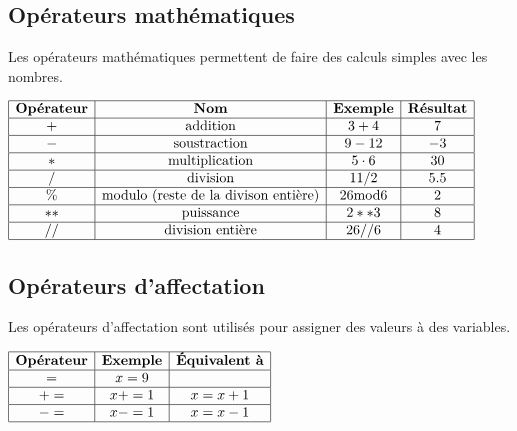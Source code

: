 \documentclass[a4paper,11pt]{article}
\begin{document}
\subsection{Opérateurs mathématiques}
Les opérateurs mathématiques permettent de faire des calculs simples avec les nombres.\par
\begin{center}
$\begin{array}{|c|c|c|c|}
\hline
\textbf{Opérateur} & \textbf{Nom} & \textbf{Exemple} & \textbf{Résultat} \\
\hline
+ & \text{addition} & 3 + 4 & 7\\
\hline
- & \text{soustraction} & 9 - 12 & -3\\
\hline
* & \text{multiplication} & 5 \cdot 6 & 30\\
\hline
/ & \text{division} & 11 / 2 & 5.5\\
\hline
\% & \text{modulo (reste de la divison entière)} & 26 \text{mod} 6 & 2\\
\hline
** & \text{puissance} & 2**3 & 8\\
\hline
// & \text{division entière} & 26 // 6 & 4\\
\hline
\end{array}$
\end{center}

\subsection{Opérateurs d'affectation}
Les opérateurs d'affectation sont utilisés pour assigner des valeurs à des variables.\par
\begin{center}
$\begin{array}{|c|c|c|}
\hline
\textbf{Opérateur} & \textbf{Exemple} & \textbf{Équivalent à} \\
\hline
= & x = 9 & \\
\hline
+= & x += 1 & x = x + 1\\
\hline
-= & x -= 1 & x = x -1\\
\hline
\end{array}$
\end{center}
\end{document}
